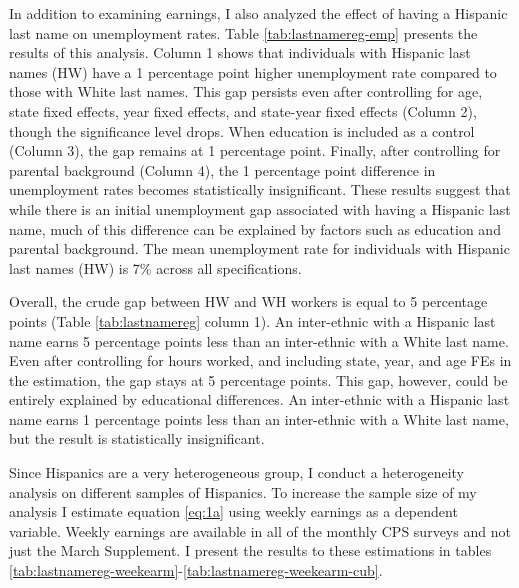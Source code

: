In addition to examining earnings, I also analyzed the effect of having a Hispanic last name on unemployment rates. Table \ref{tab:lastnamereg-emp} presents the results of this analysis. Column 1 shows that individuals with Hispanic last names (HW) have a 1 percentage point higher unemployment rate compared to those with White last names. This gap persists even after controlling for age, state fixed effects, year fixed effects, and state-year fixed effects (Column 2), though the significance level drops. When education is included as a control (Column 3), the gap remains at 1 percentage point. Finally, after controlling for parental background (Column 4), the 1 percentage point difference in unemployment rates becomes statistically insignificant. These results suggest that while there is an initial unemployment gap associated with having a Hispanic last name, much of this difference can be explained by factors such as education and parental background. The mean unemployment rate for individuals with Hispanic last names (HW) is 7\% across all specifications.

Overall, the crude gap between HW and WH workers is equal to 5 percentage points (Table \ref{tab:lastnamereg} column 1). An inter-ethnic with a Hispanic last name earns 5 percentage points less than an inter-ethnic with a White last name. Even after controlling for hours worked, and including state, year, and age FEs in the estimation, the gap stays at 5 percentage points. This gap, however, could be entirely explained by educational differences. An inter-ethnic with a Hispanic last name earns 1 percentage points less than an inter-ethnic with a White last name, but the result is statistically insignificant. 

Since Hispanics are a very heterogeneous group, I conduct a heterogeneity analysis on different samples of Hispanics. To increase the sample size of my analysis I estimate equation \ref{eq:1a} using weekly earnings as a dependent variable. Weekly earnings are available in all of the monthly CPS surveys and not just the March Supplement. I present the results to these estimations in tables \ref{tab:lastnamereg-weekearm}-\ref{tab:lastnamereg-weekearm-cub}. 


